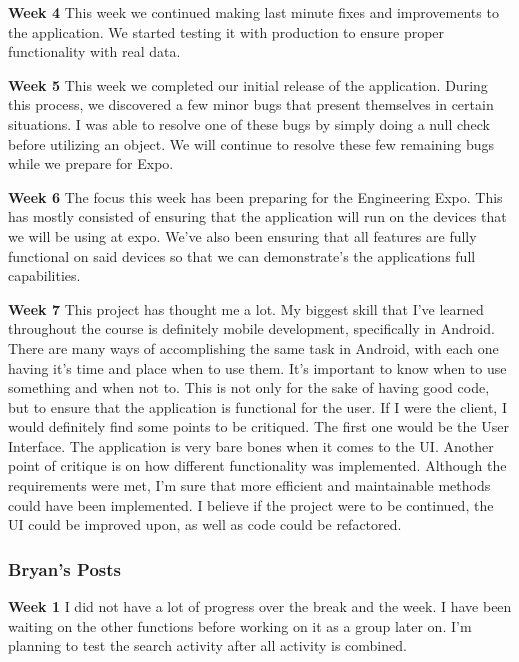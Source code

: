 \documentclass[journal,compsoc, 10pt, draftclsnofoot, onecolumn]{IEEEtran}
\begin{document}
\textbf{Week 4}\newline
This week we continued making last minute fixes and improvements to the application. We started 
testing it with production to ensure proper functionality with real data.\newline

\textbf{Week 5}\newline
This week we completed our initial release of the application. During this process, we
discovered a few minor bugs that present themselves in certain situations. I was able to
resolve one of these bugs by simply doing a null check before utilizing an object. We will
continue to resolve these few remaining bugs while we prepare for Expo.\newline

\textbf{Week 6}\newline
The focus this week has been preparing for the Engineering Expo. This has mostly consisted of
ensuring that the application will run on the devices that we will be using at expo. We've also 
been ensuring that all features are fully functional on said devices so that we can
demonstrate's the applications full capabilities.\newline

\textbf{Week 7}\newline
This project has thought me a lot. My biggest skill that I've learned throughout the course is
definitely mobile development, specifically in Android. There are many ways of accomplishing
the same task in Android, with each one having it's time and place when to use them. It's
important to know when to use something and when not to. This is not only for the sake of
having good code, but to ensure that the application is functional for the user. If I were the
client, I would definitely find some points to be critiqued. The first one would be the User
Interface. The application is very bare bones when it comes to the UI. Another point of
critique is on how different functionality was implemented. Although the requirements were met, 
I'm sure that more efficient and maintainable methods could have been implemented. I believe if 
the project were to be continued, the UI could be improved upon, as well as code could be
refactored. \newline

\subsubsection*{Bryan's Posts}
\textbf{Week 1}\newline
I did not have a lot of progress over the break and the week. I have been waiting on the other
functions before working on it as a group later on. I'm planning to test the search activity
after all activity is combined.\newline
\end{document}
